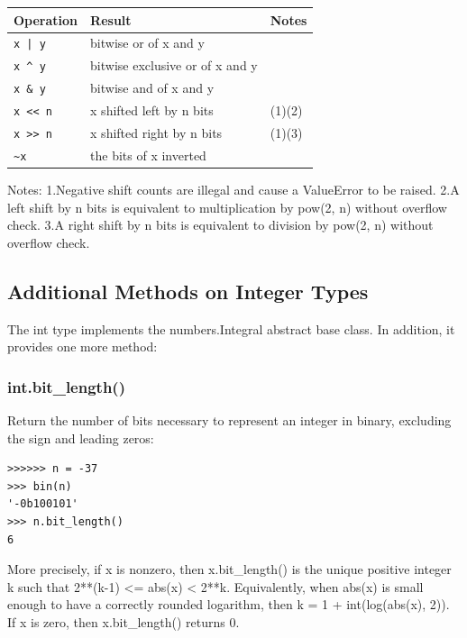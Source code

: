 \begin{table}[ht]
	\centering
	\begin{tabular}{|l|l|l|}
		\hline
		Operation & Result & Notes\\
		\hline
		\verb!x | y! & bitwise or of x and y &   \\
		\verb|x ^ y| & bitwise exclusive or of x and y &   \\
		\verb|x & y| & bitwise and of x and y &   \\				
		\verb|x << n| & x shifted left by n bits & (1)(2) \\
		\verb|x >> n| & x shifted right by n bits & (1)(3) \\
		\verb|~x| & the bits of x inverted &  \\				
		\hline
	\end{tabular}
\end{table}

    

Notes:
1.Negative shift counts are illegal and cause a ValueError to be raised.
2.A left shift by n bits is equivalent to multiplication by pow(2, n) without overflow check.
3.A right shift by n bits is equivalent to division by pow(2, n) without overflow check.

\subsection{Additional Methods on Integer Types}
 
The int type implements the numbers.Integral abstract base class. In addition, it provides one more method:

\subsubsection{int.bit\_length()}

Return the number of bits necessary to represent an integer in binary, excluding the sign and leading zeros:

\begin{lstlisting}
>>>>>> n = -37
>>> bin(n)
'-0b100101'
>>> n.bit_length()
6
\end{lstlisting}

More precisely, if x is nonzero, then x.bit\_length() is the unique positive integer k such that 2**(k-1) <= abs(x) < 2**k. Equivalently, when abs(x) is small enough to have a correctly rounded logarithm, then k = 1 + int(log(abs(x), 2)). If x is zero, then x.bit\_length() returns 0.

